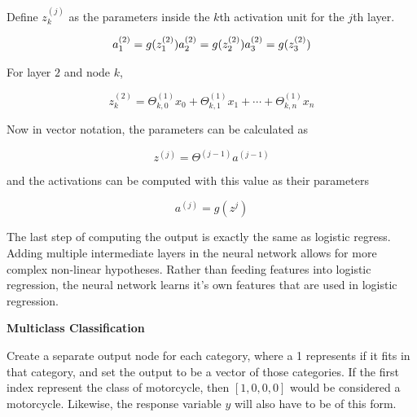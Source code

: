 \documentclass[
]{article}
\begin{document}
Define \(z_k^{(j)}\) as the parameters inside the \(k\)th activation
unit for the \(j\)th layer.

\begin{align*}a_1^{(2)} = g(z_1^{(2)}) \newline a_2^{(2)} = g(z_2^{(2)}) \newline a_3^{(2)} = g(z_3^{(2)}) \newline \end{align*}

For layer \(2\) and node \(k\),

\[z_k^{(2)} = \Theta_{k,0}^{(1)}x_0 + \Theta_{k,1}^{(1)}x_1 + \cdots + \Theta_{k,n}^{(1)}x_n\]

Now in vector notation, the parameters can be calculated as

\[z^{(j)} = \Theta^{(j-1)}a^{(j-1)}\]

and the activations can be computed with this value as their parameters

\[a^{(j)} = g(z^{j})\]

The last step of computing the output is exactly the same as logistic
regress. Adding multiple intermediate layers in the neural network
allows for more complex non-linear hypotheses. Rather than feeding
features into logistic regression, the neural network learns it's own
features that are used in logistic regression.

\textbf{Multiclass Classification}

Create a separate output node for each category, where a 1 represents if
it fits in that category, and set the output to be a vector of those
categories. If the first index represent the class of motorcycle, then
\([1,0,0,0]\) would be considered a motorcycle. Likewise, the response
variable \(y\) will also have to be of this form.
\end{document}
